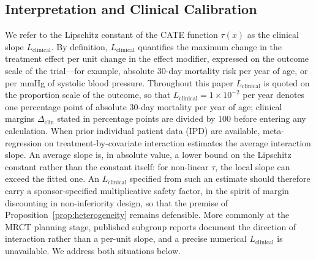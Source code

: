 \documentclass[AMA,Times1COL]{WileyNJDv5}
\begin{document}
\subsection{Interpretation and Clinical Calibration}\label{sec:inference}


We refer to the Lipschitz constant of the CATE function $\tau(x)$ as the clinical slope $L_{\text{clinical}}$. By definition, $L_{\text{clinical}}$ quantifies the maximum change in the treatment effect per unit change in the effect modifier, expressed on the outcome scale of the trial---for example, absolute 30-day mortality risk per year of age, or per mmHg of systolic blood pressure. Throughout this paper $L_{\text{clinical}}$ is quoted on the proportion scale of the outcome, so that $L_{\text{clinical}} = 1 \times 10^{-2}$ per year denotes one percentage point of absolute 30-day mortality per year of age; clinical margins $\Delta_{\text{clin}}$ stated in percentage points are divided by 100 before entering any calculation. When prior individual patient data (IPD) are available, meta-regression on treatment-by-covariate interaction estimates the average interaction slope.\cite{riley2010,fisher2017} An average slope is, in absolute value, a lower bound on the Lipschitz constant rather than the constant itself: for non-linear $\tau$, the local slope can exceed the fitted one. An $L_{\text{clinical}}$ specified from such an estimate should therefore carry a sponsor-specified multiplicative safety factor, in the spirit of margin discounting in non-inferiority design, so that the premise of Proposition~\ref{prop:heterogeneity} remains defensible. More commonly at the MRCT planning stage, published subgroup reports document the direction of interaction rather than a per-unit slope, and a precise numerical $L_{\text{clinical}}$ is unavailable. We address both situations below.
\end{document}
